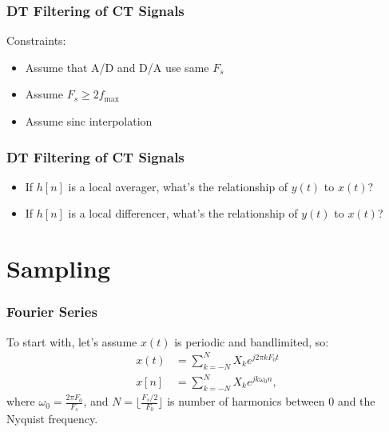 \documentclass{beamer}
\begin{document}
\begin{frame}
  \frametitle{DT Filtering of CT Signals}
  \begin{center}
  \end{center}
  Constraints:
  \begin{itemize}
  \item Assume that A/D and D/A use same $F_s$
  \item Assume $F_s\ge 2f_{\text{max}}$
  \item Assume sinc interpolation
  \end{itemize}
\end{frame}

\begin{frame}
  \frametitle{DT Filtering of CT Signals}

  \begin{itemize}
  \item If $h[n]$ is a local averager, what's the relationship of $y(t)$ to $x(t)$?
  \item If $h[n]$ is a local differencer, what's the relationship of $y(t)$ to $x(t)$?
  \end{itemize}
\end{frame}

\section{Sampling}
\setcounter{subsection}{1}

\begin{frame}
  \frametitle{Fourier Series}

  To start with, let's assume $x(t)$ is periodic and bandlimited, so:
  \begin{align*}
    x(t)&=\sum_{k=-N}^{N}X_ke^{j2\pi kF_0t}\\
    x[n]&=\sum_{k=-N}^{N}X_ke^{jk\omega_0n},
  \end{align*}
  where $\omega_0=\frac{2\pi F_0}{F_s}$, and
  $N=\lfloor\frac{F_s/2}{F_0}\rfloor$ is number of harmonics between 0
  and the Nyquist frequency.
\end{frame}
\end{document}
